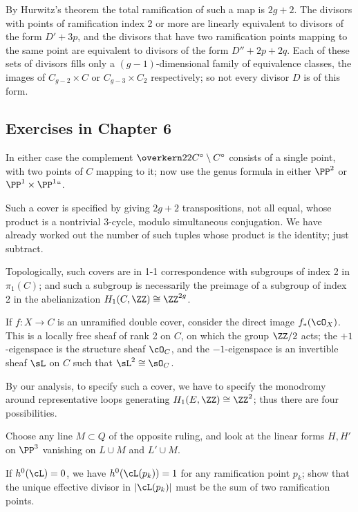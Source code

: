 By
Hurwitz's theorem
%
the total ramification of such a map is $2g+2$. The divisors with points of ramification
index 2 or more are linearly equivalent to divisors of the form $D'+3p$, and the divisors that have two ramification
points mapping to the same point are equivalent to divisors of the form $D''+2p+2q$. Each of these sets
of divisors fills only a
$(g{-}1)$-dimensional family of equivalence classes, the images of
$C_{g-2}\times C$ or $C_{g-3}\times C_2$ respectively; so not every divisor $D$ is of this form.

\subsection*{Exercises in Chapter 6}

 In either case the complement $\overkern22{C^\circ}
  \setminus C^\circ$ consists of a single point, with two points of $C$
  mapping to it; now use the genus formula in either $\PP^2$ or $\PP^1
  \times \PP^1` `$.

Such a cover is specified by giving $2g+2$ transpositions, not
all equal, whose product is a nontrivial 3-cycle, modulo simultaneous
conjugation. We have already worked out the number of such tuples whose
product is the identity; just subtract.

 Topologically, such covers are in 1-1 correspondence with
subgroups of index 2 in $\pi_1(C)$; and such a subgroup is necessarily
the preimage of a subgroup of index 2 in the abelianization $H_1(C, \ZZ)
\cong \ZZ^{2g}$.

If $f : X \to C$ is an unramified double cover, consider the direct
image $f_*(\cO_X)$. This is a locally free sheaf of rank 2 on $C$,
on which the group $\ZZ/2$ acts; the $+1$-eigenspace is the structure
sheaf $\cO_C$, and the $-1$-eigenspace is an invertible sheaf $\sL$
on $C$ such that $\sL^2 \cong \sO_C$.

By our analysis, to specify such a cover, we have to specify the
monodromy around representative loops generating $H_1(E, \ZZ) \cong\ZZ^2$;
thus there are four possibilities.

Choose any line $M \subset Q$ of the opposite ruling, and look at the
linear forms $H, H'$ on $\PP^3$ vanishing on $L \cup M$ and $L' \cup M$.

 If $h^0(\cL) = 0$,
we have $h^0(\cL(p_k)) = 1$ for any ramification point $p_k$;
show that  the unique effective divisor in
 $|\cL(p_k)|$ must be the sum of two ramification points.

